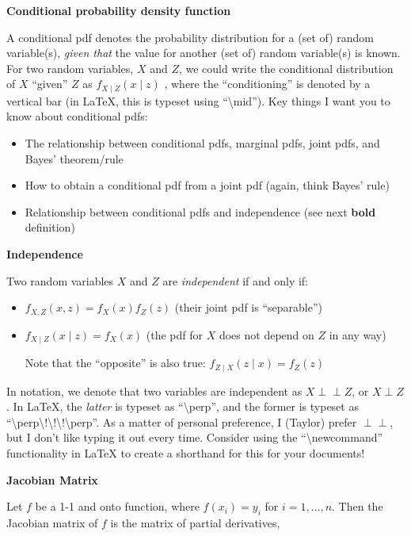 \documentclass[
  letterpaper,
  DIV=11,
  numbers=noendperiod]{scrreprt}
\begin{document}
\textbf{Conditional probability density function}

A conditional pdf denotes the probability distribution for a (set of)
random variable(s), \emph{given that} the value for another (set of)
random variable(s) is known. For two random variables, \(X\) and \(Z\),
we could write the conditional distribution of \(X\) ``given'' \(Z\) as
\(f_{X \mid Z}(x \mid z)\) , where the ``conditioning'' is denoted by a
vertical bar (in LaTeX, this is typeset using ``\textbackslash mid'').
Key things I want you to know about conditional pdfs:

\begin{itemize}
\item
  The relationship between conditional pdfs, marginal pdfs, joint pdfs,
  and Bayes' theorem/rule
\item
  How to obtain a conditional pdf from a joint pdf (again, think Bayes'
  rule)
\item
  Relationship between conditional pdfs and independence (see next
  \textbf{bold} definition)
\end{itemize}

\textbf{Independence}

Two random variables \(X\) and \(Z\) are \emph{independent} if and only
if:

\begin{itemize}
\item
  \(f_{X,Z}(x,z) = f_X(x) f_Z(z)\) (their joint pdf is ``separable'')
\item
  \(f_{X\mid Z}(x\mid z) = f_X(x)\) (the pdf for \(X\) does not depend
  on \(Z\) in any way)

  Note that the ``opposite'' is also true:
  \(f_{Z\mid X}(z\mid x) = f_Z(z)\)
\end{itemize}

In notation, we denote that two variables are independent as
\(X \perp\!\!\!\perp Z\), or \(X \perp Z\). In LaTeX, the \emph{latter}
is typeset as ``\textbackslash perp'', and the former is typeset as
``\textbackslash perp\textbackslash!\textbackslash!\textbackslash!\textbackslash perp''.
As a matter of personal preference, I (Taylor) prefer
\(\perp\!\!\!\perp\), but I don't like typing it out every time.
Consider using the ``\textbackslash newcommand'' functionality in LaTeX
to create a shorthand for this for your documents!

\textbf{Jacobian Matrix}

Let \(f\) be a 1-1 and onto function, where \(f(x_i) = y_i\) for
\(i = 1, \dots, n\). Then the Jacobian matrix of \(f\) is the matrix of
partial derivatives,
\end{document}
